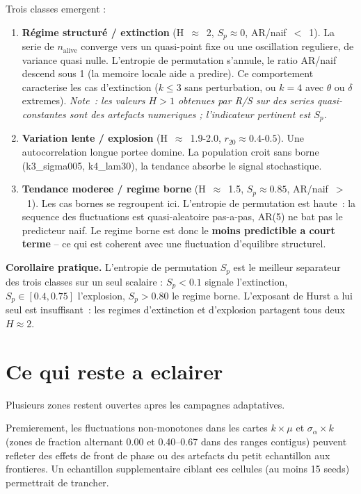 \documentclass[11pt,a4paper]{article}
\begin{document}
Trois classes emergent :

\begin{enumerate}
  \item \textbf{Régime structuré / extinction} (H~$\approx$~2, $S_p \approx 0$, AR/naif~$<$~1).
    La serie de $n_{\mathrm{alive}}$ converge vers un quasi-point fixe ou une oscillation
    reguliere, de variance quasi nulle. L'entropie de permutation s'annule, le ratio AR/naif
    descend sous 1 (la memoire locale aide a predire). Ce comportement caracterise les cas
    d'extinction ($k \le 3$ sans perturbation, ou $k=4$ avec $\theta$ ou $\delta$ extremes).
    \textit{Note~: les valeurs $H>1$ obtenues par R/S sur des series quasi-constantes sont
    des artefacts numeriques ; l'indicateur pertinent est $S_p$.}

  \item \textbf{Variation lente / explosion} (H~$\approx$~1.9-2.0, $r_{20} \approx 0.4$-$0.5$).
    Une autocorrelation longue portee domine. La population croit sans borne (k3\_sigma005,
    k4\_lam30), la tendance absorbe le signal stochastique.

  \item \textbf{Tendance moderee / regime borne} (H~$\approx$~1.5, $S_p \approx 0.85$,
    AR/naif~$>$~1). Les cas bornes se regroupent ici. L'entropie de permutation est haute~:
    la sequence des fluctuations est quasi-aleatoire pas-a-pas, AR(5) ne bat pas le predicteur
    naif. Le regime borne est donc le \textbf{moins predictible a court terme} -- ce qui est
    coherent avec une fluctuation d'equilibre structurel.
\end{enumerate}

\textbf{Corollaire pratique.} L'entropie de permutation $S_p$ est le meilleur separateur
des trois classes sur un seul scalaire : $S_p < 0.1$ signale l'extinction, $S_p \in [0.4, 0.75]$
l'explosion, $S_p > 0.80$ le regime borne. L'exposant de Hurst a lui seul est insuffisant~:
les regimes d'extinction et d'explosion partagent tous deux $H \approx 2$.

\section{Ce qui reste a eclairer}

Plusieurs zones restent ouvertes apres les campagnes adaptatives.

Premierement, les fluctuations non-monotones dans les cartes \(k\times\mu\)
et \(\sigma_\alpha\times k\) (zones de fraction alternant 0.00 et 0.40--0.67
dans des ranges contigus) peuvent refleter des effets de front de phase ou des
artefacts du petit echantillon aux frontieres. Un echantillon supplementaire
ciblant ces cellules (au moins 15 seeds) permettrait de trancher.
\end{document}
